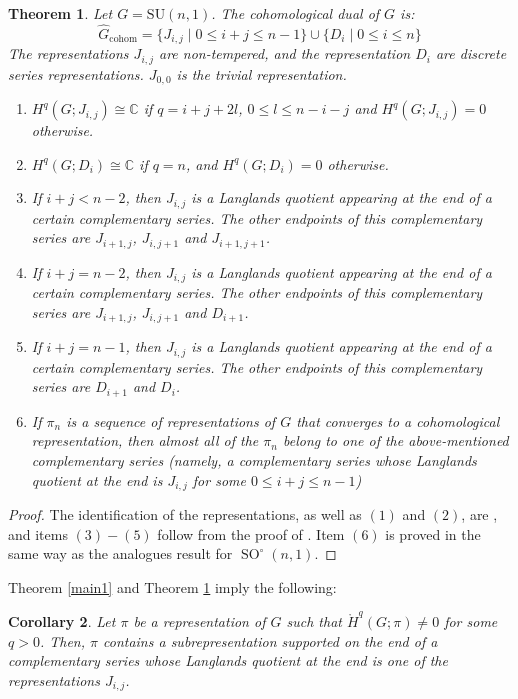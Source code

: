 \documentclass[12pt,reqno]{amsart}
\newcommand{\C}{\mathbb{C}}
\newtheorem{theorem}{Theorem}[section]
\newtheorem{corollary}[theorem]{Corollary}
\theoremstyle{definition}
\newcommand{\SO}{\operatorname{SO}}
\newcommand{\torH}{\mathring{H}}
\begin{document}
\begin{theorem}\label{thm:cohomological dual of su(n,1)}
    Let $G=\mathrm{SU}(n,1)$. The cohomological dual of $G$ is:
    \[
    \widehat{G}_\mathrm{cohom}=\{J_{i,j} \mid 0 \leq i+j \leq n-1 \} \cup \{D_i \mid 0 \leq i \leq n\}
    \]
    The representations $J_{i,j}$ are non-tempered, and the representation $D_i$ are discrete series representations. $J_{0,0}$ is the trivial representation.
    \begin{enumerate}
        \item $H^q(G;J_{i,j}) \cong \mathbb{C}$ if $q=i+j+2l$, $0 \leq l \leq n-i-j$ and $H^q(G;J_{i,j})=0$ otherwise.
        \item $H^q(G;D_i) \cong \C$ if $q=n$, and $H^q(G;D_i)=0$ otherwise.
        \item If $i+j < n-2$, then $J_{i,j}$ is a Langlands quotient appearing at the end of a certain complementary series. The other endpoints of this complementary series are $J_{i+1,j}$, $J_{i,j+1}$ and $J_{i+1,j+1}$. 
        \item If $i+j = n-2$, then $J_{i,j}$ is a Langlands quotient appearing at the end of a certain complementary series. The other endpoints of this complementary series are $J_{i+1,j}$, $J_{i,j+1}$ and $D_{i+1}$.
        \item If $i+j = n-1$, then $J_{i,j}$ is a Langlands quotient appearing at the end of a certain complementary series. The other endpoints of this complementary series are $D_{i+1}$ and $D_{i}$. 
        \item If $\pi_n$ is a sequence of representations of $G$ that converges to a cohomological representation, then almost all of the $\pi_n$ belong to one of the above-mentioned complementary series (namely, a complementary series whose Langlands quotient at the end is $J_{i,j}$ for some $0 \leq i+j \leq n-1$)
    \end{enumerate}
\end{theorem}
\begin{proof}
    The identification of the representations, as well as $(1)$ and $(2)$, are \cite[Theorem~VI.4.11]{BorelWallach}, and items $(3)-(5)$ follow from the proof of \cite[Theorem~VI.4.11]{BorelWallach}. Item $(6)$ is proved in the same way as the analogues result for $\SO^\circ(n,1)$.
\end{proof}
Theorem \ref{main1} and Theorem \ref{thm:cohomological dual of su(n,1)} imply the following:
\begin{corollary}
    Let $\pi$ be a representation of $G$ such that $\torH^q(G;\pi) \ne 0$ for some $q > 0$. Then, $\pi$ contains a subrepresentation supported on the end of a complementary series whose Langlands quotient at the end is one of the representations $J_{i,j}$.
\end{corollary}
\end{document}
